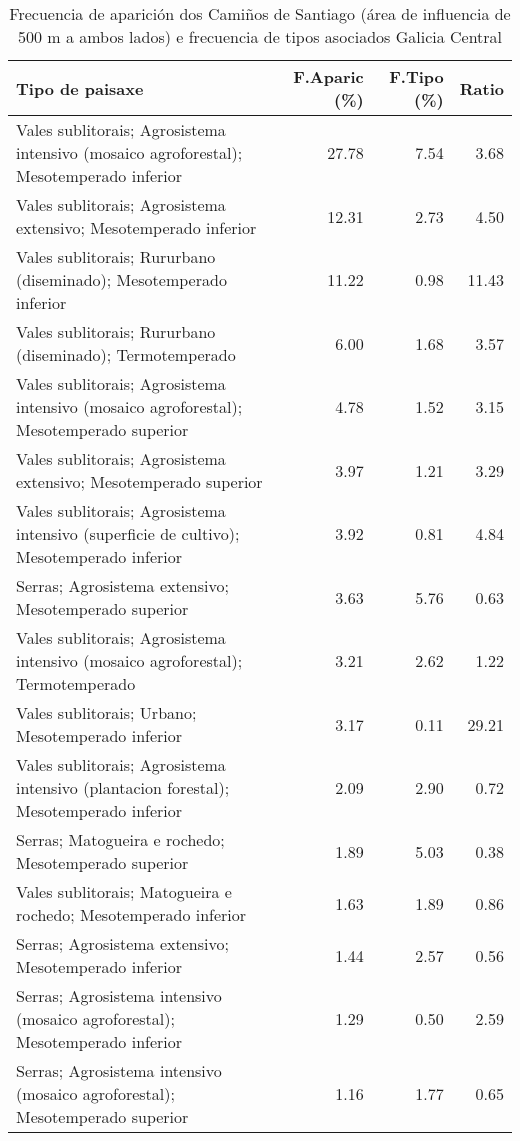 \begin{table}[p]
\centering
\caption{Frecuencia de aparición dos Camiños de Santiago (área de influencia de 500 m a ambos lados) e frecuencia de tipos asociados Galicia Central} 
\label{vcamino7}
\begin{tabular}{lrrr}
  \hline
Tipo de paisaxe & F.Aparic (\%) & F.Tipo (\%) & Ratio \\ 
  \hline
Vales sublitorais; Agrosistema intensivo (mosaico agroforestal); Mesotemperado inferior & 27.78 & 7.54 & 3.68 \\ 
  Vales sublitorais; Agrosistema extensivo; Mesotemperado inferior & 12.31 & 2.73 & 4.50 \\ 
  Vales sublitorais; Rururbano (diseminado); Mesotemperado inferior & 11.22 & 0.98 & 11.43 \\ 
  Vales sublitorais; Rururbano (diseminado); Termotemperado & 6.00 & 1.68 & 3.57 \\ 
  Vales sublitorais; Agrosistema intensivo (mosaico agroforestal); Mesotemperado superior & 4.78 & 1.52 & 3.15 \\ 
  Vales sublitorais; Agrosistema extensivo; Mesotemperado superior & 3.97 & 1.21 & 3.29 \\ 
  Vales sublitorais; Agrosistema intensivo (superficie de cultivo); Mesotemperado inferior & 3.92 & 0.81 & 4.84 \\ 
  Serras; Agrosistema extensivo; Mesotemperado superior & 3.63 & 5.76 & 0.63 \\ 
  Vales sublitorais; Agrosistema intensivo (mosaico agroforestal); Termotemperado & 3.21 & 2.62 & 1.22 \\ 
  Vales sublitorais; Urbano; Mesotemperado inferior & 3.17 & 0.11 & 29.21 \\ 
  Vales sublitorais; Agrosistema intensivo (plantacion forestal); Mesotemperado inferior & 2.09 & 2.90 & 0.72 \\ 
  Serras; Matogueira e rochedo; Mesotemperado superior & 1.89 & 5.03 & 0.38 \\ 
  Vales sublitorais; Matogueira e rochedo; Mesotemperado inferior & 1.63 & 1.89 & 0.86 \\ 
  Serras; Agrosistema extensivo; Mesotemperado inferior & 1.44 & 2.57 & 0.56 \\ 
  Serras; Agrosistema intensivo (mosaico agroforestal); Mesotemperado inferior & 1.29 & 0.50 & 2.59 \\ 
  Serras; Agrosistema intensivo (mosaico agroforestal); Mesotemperado superior & 1.16 & 1.77 & 0.65 \\ 
   \hline
\end{tabular}
\end{table}
